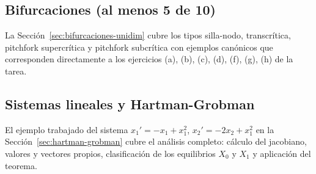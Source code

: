 \documentclass[11pt,letterpaper]{article}
\begin{document}
\subsection{Bifurcaciones (al menos 5 de 10)}

La Sección~\ref{sec:bifurcaciones-unidim} cubre los tipos silla-nodo,
transcrítica, pitchfork supercrítica y pitchfork subcrítica con ejemplos
canónicos que corresponden directamente a los ejercicios (a), (b), (c), (d),
(f), (g), (h) de la tarea.

\subsection{Sistemas lineales y Hartman-Grobman}

El ejemplo trabajado del sistema $x_1'=-x_1+x_1^2$, $x_2'=-2x_2+x_1^2$
en la Sección~\ref{sec:hartman-grobman} cubre el análisis completo:
cálculo del jacobiano, valores y vectores propios, clasificación de los
equilibrios $X_0$ y $X_1$ y aplicación del teorema.
\end{document}
